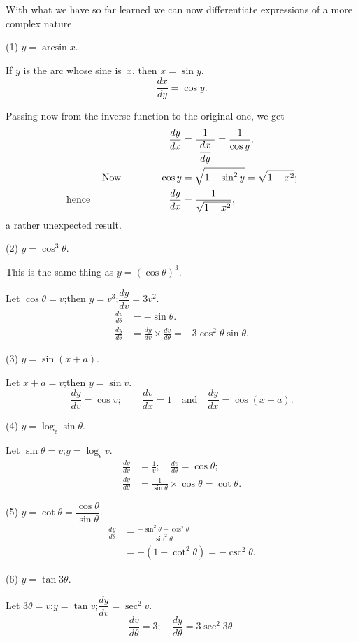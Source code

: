 \documentclass[12pt]{book}%
\begin{document}
With what we have so far learned we can now differentiate expressions of a
more complex nature.

(1) $y=\arcsin x$.

If $y$ is the arc whose sine is~$x$, then $x = \sin y$.
\[
\frac{dx}{dy}=\cos y.
\]


Passing now from the inverse function to the original one, we get
\begin{align*}
\frac{dy}{dx}  &  = \frac{1}{\;\dfrac{dx}{dy}\;} = \frac{1}{\cos y}.\\
\text{Now\qquad\qquad} \cos y  &  = \sqrt{1-\sin^{2} y}=\sqrt{1-x^{2}};\\
\text{hence\qquad\qquad\qquad\qquad} \frac{dy}{dx}  &  = \frac{1}%
{\sqrt{1-x^{2}}},
\end{align*}
a rather unexpected result.

(2) $y=\cos^{3} \theta$.

This is the same thing as $y=(\cos\theta)^{3}$.

Let $\cos\theta=v$;\quad then $y=v^{3}$;\quad$\dfrac{dy}{dv}=3v^{2}$.
\begin{align*}
\frac{dv}{d\theta}  &  = -\sin\theta.\\
\frac{dy}{d\theta}  &  = \frac{dy}{dv} \times\frac{dv}{d\theta} = -3 \cos^{2}
\theta\sin\theta.
\end{align*}


(3) $y=\sin(x+a)$.

Let $x+a=v$;\quad then $y=\sin v$.
\[
\frac{dy}{dv}=\cos v;\qquad\frac{dv}{dx}=1 \quad\text{and}\quad\frac{dy}%
{dx}=\cos(x+a).
\]


(4) $y=\log_{\epsilon}\sin\theta$.

Let $\sin\theta=v$;\quad$y=\log_{\epsilon}v$.
\begin{align*}
\frac{dy}{dv}  &  = \frac{1}{v};\quad\frac{dv}{d\theta}=\cos\theta;\\
\frac{dy}{d\theta}  &  = \frac{1}{\sin\theta} \times\cos\theta= \cot\theta.
\end{align*}


(5) $y=\cot\theta=\dfrac{\cos\theta}{\sin\theta}$.
\begin{align*}
\frac{dy}{d\theta}  &  = \frac{-\sin^{2}\theta- \cos^{2} \theta}{\sin^{2}
\theta}\\
&  = -(1+\cot^{2} \theta) = -\csc^{2} \theta.
\end{align*}


(6) $y=\tan3\theta$.

Let $3\theta=v$;\quad$y=\tan v$;\quad$\dfrac{dy}{dv}=\sec^{2} v$.
\[
\frac{dv}{d\theta}=3;\quad\frac{dy}{d\theta}=3 \sec^{2} 3\theta.
\]
\end{document}
